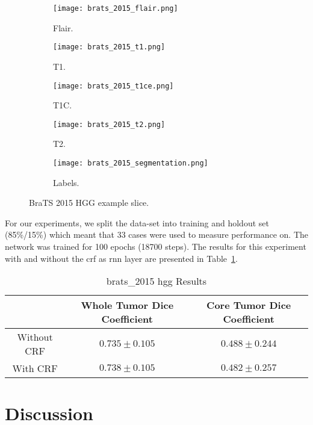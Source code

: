 \documentclass{article}
\begin{document}
\begin{figure}[ht]
\centering
\begin{subfigure}{.2\textwidth}
  \centering
  \texttt{[image: brats\_2015\_flair.png]}
  \caption{Flair.}
\end{subfigure}\begin{subfigure}{.2\textwidth}
  \centering
  \texttt{[image: brats\_2015\_t1.png]}
  \caption{T1.}
\end{subfigure}\begin{subfigure}{.2\textwidth}
  \centering
  \texttt{[image: brats\_2015\_t1ce.png]}
  \caption{T1C.}
\end{subfigure}\begin{subfigure}{.2\textwidth}
  \centering
  \texttt{[image: brats\_2015\_t2.png]}
  \caption{T2.}
\end{subfigure}\begin{subfigure}{.2\textwidth}
  \centering
  \texttt{[image: brats\_2015\_segmentation.png]}
  \caption{Labels.}
\end{subfigure}
\caption{BraTS 2015 HGG example slice.}
\label{fig:brats_2015}
\end{figure}


For our experiments, we split the data-set into training and holdout set (85\%/15\%) which meant that 33 cases were used to measure performance on.
The network was trained for 100 epochs (18700 steps).
The results for this experiment with and without the \gls{crf} as \gls{rnn} layer are presented in Table~\ref{tab:brats_2015}.

\begin{table}[!h]
\centering
\caption{\gls{brats_2015} \gls{hgg} Results}
\label{tab:brats_2015}
\begin{tabular}{@{}ccc@{}}
\toprule
            & Whole Tumor Dice Coefficient        & Core Tumor Dice Coefficient         \\ \midrule
Without CRF & $0.735 \pm 0.105$   & $0.488 \pm 0.244$                                   \\
With CRF    & $0.738 \pm 0.105$   & $0.482 \pm 0.257$                                   \\ \bottomrule
\end{tabular}
\end{table}



\section{Discussion}
\end{document}

